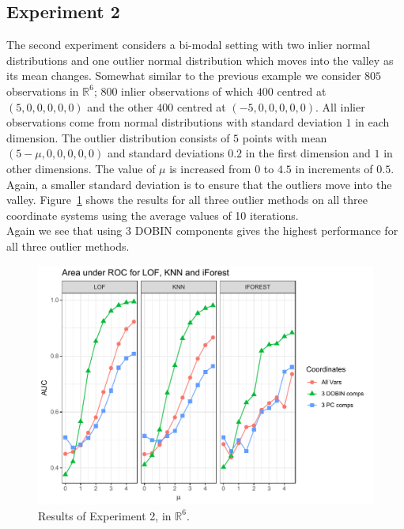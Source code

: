 \documentclass[11pt]{article}
\begin{document}
\subsection{Experiment 2}
The second experiment considers a bi-modal setting with two inlier normal distributions and one outlier normal  distribution which moves into the valley as its mean changes. Somewhat similar to the previous example we consider $805$ observations in $\mathbb{R}^6$; $800$ inlier observations of which $400$  centred at $(5,0,0,0,0,0)$ and the other $400$ centred at $(-5,0,0,0,0,0)$. All inlier observations come from normal distributions with standard deviation $1$ in each dimension. The outlier distribution consists of $5$ points with mean $(5-\mu,0,0,0,0,0)$ and standard deviations $0.2$ in the first dimension and $1$ in other dimensions. The value of $\mu$ is increased from $0$ to $4.5$ in increments of $0.5$.  Again, a smaller standard deviation is to ensure that the outliers move into the valley. Figure~\ref{fig:Exp2} shows the results for all three  outlier methods on all three coordinate systems using the average values of 10 iterations. \\

Again we see that using 3 DOBIN components gives the highest performance for all three outlier methods. %

\begin{figure}[!ht]
	\centering
	\includegraphics[scale=0.5]{Exp2.pdf}
	\caption{Results of Experiment 2, in $\mathbb{R}^6$.}
	\label{fig:Exp2}
\end{figure} 
\end{document}
